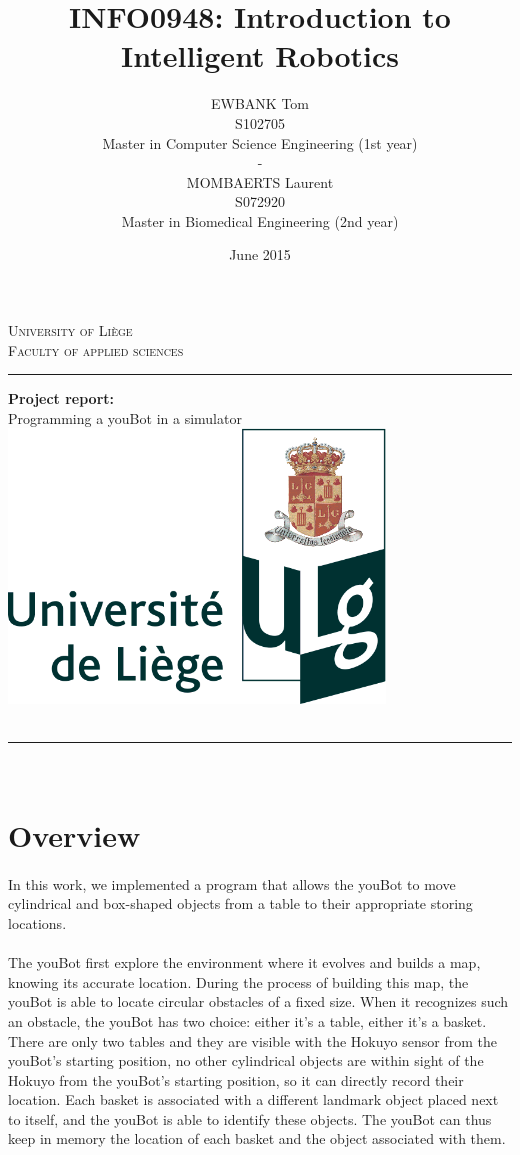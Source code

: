 \documentclass[12pt,a4paper]{article}
\author{EWBANK Tom \\S102705\\Master in Computer Science Engineering (1st year)\\-\\MOMBAERTS Laurent\\S072920\\Master in Biomedical Engineering (2nd year)}
\title{INFO0948: Introduction to Intelligent Robotics}
\date{June 2015}
\begin{document}
\makeatletter
  \begin{titlepage}
  \centering
      {\large \textsc{University of Liège}}\\
      \textsc{Faculty of applied sciences}\\
      \vspace*{0.5cm}
      \hrule
    \vfill    
    	{\LARGE \textbf{Project report:\\}}
    	{\LARGE Programming a youBot in a simulator}
    \vfill
      \includegraphics[width=10cm]{logo_ulg.png}
     \vfill
      {\large \@title \\ \  \\ \large \@date}
      
    \vfill
    \hrule
        {\large \@author} \\
  \end{titlepage}
\makeatother

\tableofcontents
\newpage

\section{Overview}

\paragraph{}
In this work, we implemented a program that allows the 
youBot to move cylindrical and box-shaped objects from a table to their 
appropriate storing locations. 

\paragraph{}
The youBot first explore the environment where it 
evolves and builds a map, knowing its accurate 
location. During the process of building this map, the 
youBot is able to locate circular obstacles of a fixed 
size. When it recognizes such an obstacle, the youBot 
has two choice: either it's a table, either it's a 
basket. There are only two tables and they are visible 
with the Hokuyo sensor from the youBot's starting 
position, no other cylindrical objects are within sight 
of the Hokuyo from the youBot's starting position, so 
it can directly record their location. Each basket is 
associated with a different landmark object placed next 
to itself, and the youBot is able to identify these 
objects. The youBot can thus keep in memory the location 
of each basket and the object associated with them.
\end{document}
